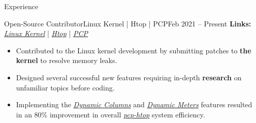 \documentclass[]{Sohaib-Mohamed}
\begin{document}
\begin{cvsection}{Experience}
   \begin{cvsubsection}{Open-Source Contributor}{Linux Kernel | Htop | PCP}{Feb 2021 -- Present}
      \textbf{Links:} \href{https://git.kernel.org/pub/scm/linux/kernel/git/next/linux-next.git/log/?qt=grep&q=sohaib}{\textit{Linux Kernel}} | \href{https://github.com/htop-dev/htop/commits?author=smalinux}{\textit{Htop}} | \href{https://github.com/performancecopilot/pcp/commits?author=smalinux}{\textit{PCP}}
      \begin{itemize}
         \item Contributed to the Linux kernel development by submitting patches to \textbf{the kernel} to resolve memory leaks.
         \item Designed several successful new features requiring in-depth \textbf{research} on unfamiliar topics before coding.
         \item Implementing the \href{https://github.com/htop-dev/htop/pull/707}{\textit{Dynamic Columns}} and \href{https://github.com/htop-dev/htop/pull/669}{\textit{Dynamic Meters}} features resulted in an 80\% improvement in overall \href{https://man.archlinux.org/man/pcp-htop.1.en}{\textit{pcp-htop}} system efficiency.
      \end{itemize}
   \end{cvsubsection}
\end{cvsection}
\end{document}
